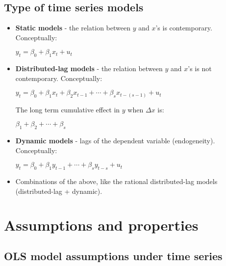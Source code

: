 \documentclass[10pt, a4paper, landscape]{article}
\begin{document}
\begin{multicols}{3}
		\subsection*{Type of time series models}
		
		\begin{itemize}[leftmargin=*]
			\item \textbf{Static models} - the relation between $y$ and $x$'s is contemporary. Conceptually:
			
			\begin{center}
				$y_{t} = \beta_{0} + \beta_{1} x_{t} + u_{t}$
			\end{center}
			
			\item \textbf{Distributed-lag models} - the relation between $y$ and $x$'s is not contemporary. Conceptually:
			
			\begin{center}
				$y_{t} = \beta_{0} + \beta_{1} x_{t} + \beta_{2} x_{t - 1} + \cdots + \beta_{s} x_{t - (s - 1)} + u_{t}$
			\end{center}
			
			The long term cumulative effect in $y$ when $\Delta x$ is:
			
			\begin{center}
				$\beta_{1} + \beta_{2} + \cdots + \beta_{s}$
			\end{center}
			
			\item \textbf{Dynamic models} - lags of the dependent variable (endogeneity). Conceptually:
			
			\begin{center}
				$y_{t} = \beta_{0} + \beta_{1} y_{t - 1} + \cdots + \beta_{s} y_{t - s} + u_{t}$
			\end{center}
			
			\item Combinations of the above, like the rational distributed-lag models (distributed-lag + dynamic).
		\end{itemize}
		
		\columnbreak
		
		\section*{Assumptions and properties}
		
		\subsection*{OLS model assumptions under time series}
		

\end{multicols}
\end{document}
